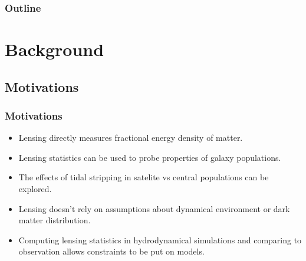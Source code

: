 \documentclass{beamer}
\title{\color{oxblue}{\sc{Stripped Down Cluster Galaxies with Gravitational Lensing}}}
\subtitle{\sc{Part III Presentation}}
\author{\sc{Joe Winterburn}}
\institute{\sc{Institute of Astronomy}}
\date{\sc 16th March 2021}
\begin{document}
  \begin{frame}
    \titlepage
  \end{frame}

  \begin{frame}
    \frametitle{\sc Outline}
    \tableofcontents
  \end{frame}

  \section{Background}

  \subsection{Motivations}

  \begin{frame}
    \frametitle{\sc Motivations}
    \begin{itemize}
      \item Lensing directly measures fractional energy density of matter.
      \item Lensing statistics can be used to probe properties of galaxy populations.
      \item The effects of tidal stripping in satelite vs central populations can be explored.
      \item Lensing doesn't rely on assumptions about dynamical environment or dark matter distribution.
      \item Computing lensing statistics in hydrodynamical simulations and comparing to observation allows constraints to be put on models.
    \end{itemize}
  \end{frame}
\end{document}
